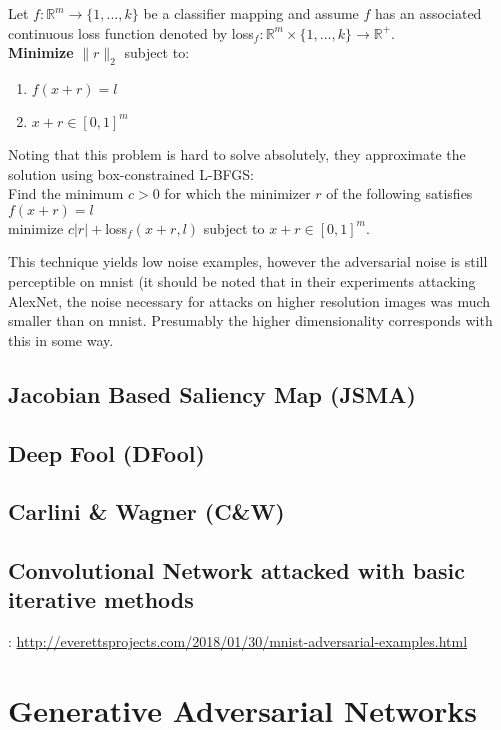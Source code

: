 \documentclass[10pt]{extarticle}\usepackage[letterpaper]{geometry}
\newcommand{\R}{\mathbb{R}}
\newcommand{\Norm}[1]{\lVert #1 \rVert}
\begin{document}
Let $f : \R^m \to \{1,...,k\}$ be a classifier mapping and assume $f$ has an associated continuous loss function denoted by loss$_f : \R^m \times \{1,...,k\} \to \R^+$. \\
\textbf{ Minimize} $\Norm{r}_2$ subject to:
\begin{enumerate}[1.]
\item $f(x + r) = l$
\item $x + r \in [0,1]^m$
\end{enumerate}

Noting that this problem is hard to solve absolutely, they approximate the solution using box-constrained L-BFGS: \\

Find the minimum $c > 0$ for which the minimizer $r$ of the following satisfies $f(x+r) = l$\\

minimize $c|r| + $loss$_f(x+r,l)$ subject to $x + r \in [0,1]^m$.

This technique yields low noise examples, however the adversarial noise is still perceptible on mnist (it should be noted that in their experiments attacking AlexNet, the noise necessary for attacks on higher resolution images was much smaller than on mnist. Presumably the higher dimensionality corresponds with this in some way.


\subsection{Jacobian Based Saliency Map (JSMA)}
\cite{papernot_limitations_2015}
\subsection{Deep Fool (DFool)}
\cite{moosavi-dezfooli_deepfool:_2015}
\subsection{Carlini \& Wagner (C\&W)}
\cite{carlini_towards_2016}


\subsection{Convolutional Network attacked with basic iterative methods}: \url{http://everettsprojects.com/2018/01/30/mnist-adversarial-examples.html}


\section{Generative Adversarial Networks}
\end{document}
